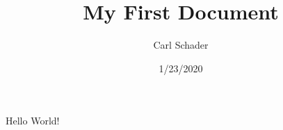 \documentclass{article}
\title{My First Document} %
\date{1/23/2020}
\author{Carl Schader}
\begin{document}
	\maketitle %
	\newpage %
	Hello World! 
\end{document}
